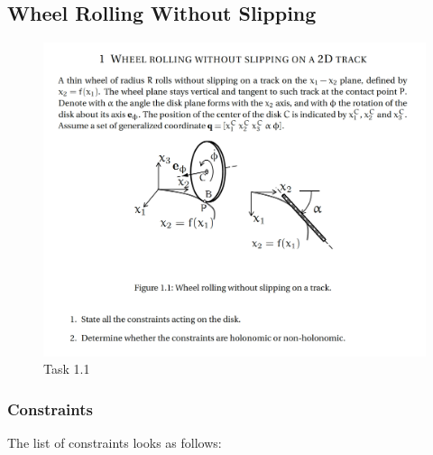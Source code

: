 \subsection{Wheel Rolling Without Slipping}
\begin{figure}[ht]
    \centering
    \includegraphics[scale=0.4]{images/1.1.png}
    \caption{Task 1.1}
    \label{fig:task1.1}
\end{figure}
\clearpage
\subsubsection{Constraints}\label{subsubsec:1.1.1}
The list of constraints looks as follows:

